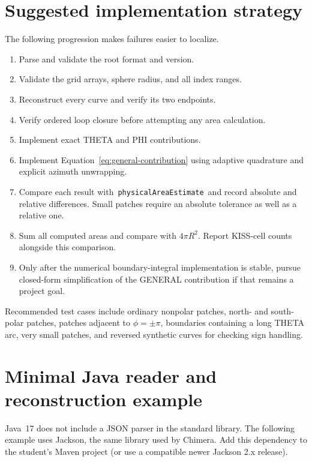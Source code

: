 \documentclass[11pt]{article}
\newcommand{\field}[1]{\texttt{#1}}
\begin{document}
\section{Suggested implementation strategy}

The following progression makes failures easier to localize.

\begin{enumerate}
  \item Parse and validate the root format and version.
  \item Validate the grid arrays, sphere radius, and all index ranges.
  \item Reconstruct every curve and verify its two endpoints.
  \item Verify ordered loop closure before attempting any area calculation.
  \item Implement exact THETA and PHI contributions.
  \item Implement Equation~\eqref{eq:general-contribution} using adaptive
        quadrature and explicit azimuth unwrapping.
  \item Compare each result with \,\field{physicalAreaEstimate}\, and record
        absolute and relative differences.  Small patches require an absolute
        tolerance as well as a relative one.
  \item Sum all computed areas and compare with $4\pi R^2$.  Report KISS-cell
        counts alongside this comparison.
  \item Only after the numerical boundary-integral implementation is stable,
        pursue closed-form simplification of the GENERAL contribution if that
        remains a project goal.
\end{enumerate}

Recommended test cases include ordinary nonpolar patches, north- and
south-polar patches, patches adjacent to $\phi=\pm\pi$, boundaries containing a
long THETA arc, very small patches, and reversed synthetic curves for checking
sign handling.

\section{Minimal Java reader and reconstruction example}

Java~17 does not include a JSON parser in the standard library.  The following
example uses Jackson, the same library used by Chimera.  Add this dependency to
the student's Maven project (or use a compatible newer Jackson 2.x release).
\end{document}
